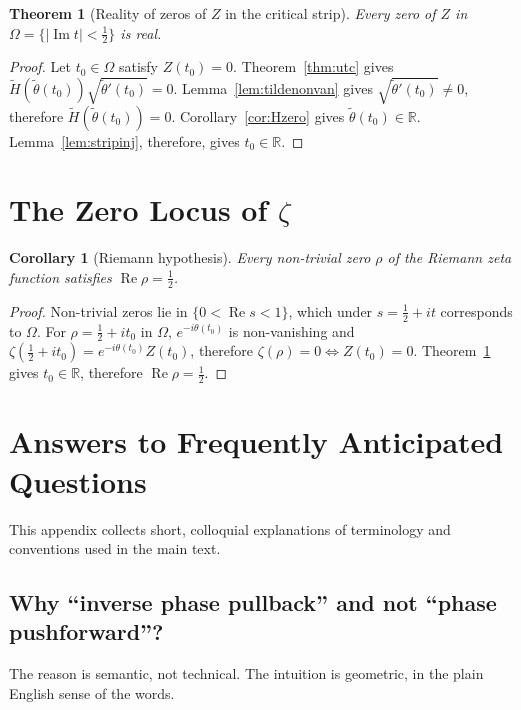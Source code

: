 \documentclass[11pt]{article}
\newtheorem{theorem}{Theorem}
\newtheorem{corollary}{Corollary}
\DeclareMathOperator{\ImOp}{Im}
\DeclareMathOperator{\ReOp}{Re}
\let\Im\ImOp
\let\Re\ReOp
\begin{document}
\begin{theorem}[Reality of zeros of $Z$ in the critical strip]\label{thm:Zreal}
Every zero of $Z$ in $\Omega=\{|\Im t|<\tfrac{1}{2}\}$ is real.
\end{theorem}

\begin{proof}
Let $t_0\in\Omega$ satisfy $Z(t_0)=0$. Theorem~\ref{thm:utc} gives $\tilde H(\tilde\theta(t_0))\sqrt{\tilde\theta'(t_0)}=0$. Lemma~\ref{lem:tildenonvan} gives $\sqrt{\tilde\theta'(t_0)}\ne 0$, therefore $\tilde H(\tilde\theta(t_0))=0$. Corollary~\ref{cor:Hzero} gives $\tilde\theta(t_0)\in\mathbb{R}$. Lemma~\ref{lem:stripinj}, therefore, gives $t_0\in\mathbb{R}$.
\end{proof}

\section{The Zero Locus of $\zeta$}

\begin{corollary}[Riemann hypothesis]\label{cor:RH}
Every non-trivial zero $\rho$ of the Riemann zeta function satisfies $\Re\rho=\tfrac{1}{2}$.
\end{corollary}

\begin{proof}
Non-trivial zeros lie in $\{0<\Re s<1\}$, which under $s=\tfrac{1}{2}+it$ corresponds to $\Omega$. For $\rho=\tfrac{1}{2}+it_0$ in $\Omega$, $e^{-i\theta(t_0)}$ is non-vanishing and $\zeta(\tfrac{1}{2}+it_0)=e^{-i\theta(t_0)}Z(t_0)$, therefore $\zeta(\rho)=0\iff Z(t_0)=0$. Theorem~\ref{thm:Zreal} gives $t_0\in\mathbb{R}$, therefore $\Re\rho=\tfrac{1}{2}$.
\end{proof}

\appendix

\section{Answers to Frequently Anticipated Questions}\label{app:FAQ}

This appendix collects short, colloquial explanations of terminology and conventions used in the main text.

\subsection{Why ``inverse phase pullback'' and not ``phase pushforward''?}\label{app:pullback-vs-pushforward}

The reason is semantic, not technical. The intuition is geometric, in the plain English sense of the words.
\end{document}
